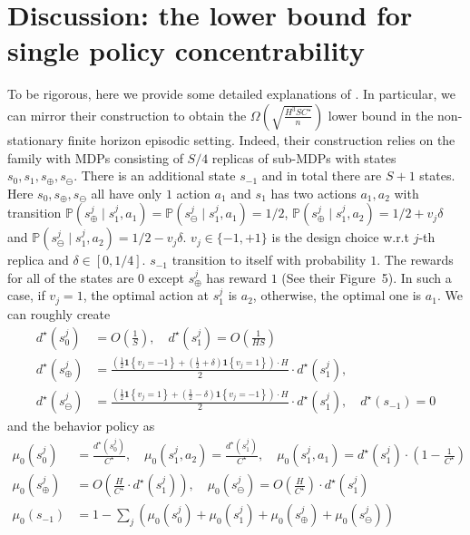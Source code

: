 \section{Discussion: the lower bound for single policy concentrability}\label{sec:dis_VPVI}


To be rigorous, here we provide some detailed explanations of \cite{rashidinejad2021bridging}. In particular, we can mirror their construction to obtain the $\Omega(\sqrt{\frac{H^3SC^\star}{n}})$ lower bound in the non-stationary finite horizon episodic setting. Indeed, their construction relies on the family with MDPs consisting of $S/4$ replicas of sub-MDPs with states $s_{0},s_1, s_{\oplus}, s_{\ominus}$. There is an additional state $s_{-1}$ and in total there are $S+1$ states. Here $s_{0},s_{\oplus}, s_{\ominus}$ all have only $1$ action $a_1$ and $s_1$ has two actions $a_1,a_2$ with transition $\mathbb{P}\left(s_{\oplus}^{j} \mid s_{1}^{j}, a_{1}\right)=\mathbb{P}\left(s_{\ominus}^{j} \mid s_{1}^{j}, a_{1}\right)=1 / 2$, $\mathbb{P}\left(s_{\oplus}^{j} \mid s_{1}^{j}, a_{2}\right)=1 / 2+v_{j} \delta$ and $\mathbb{P}\left(s_{\ominus}^{j} \mid s_{1}^{j}, a_{2}\right)=1 / 2-v_{j} \delta$. $v_{j} \in\{-1,+1\}$ is the design choice w.r.t $j$-th replica and $\delta \in[0,1 / 4]$. $s_{-1}$ transition to itself with probability $1$. The rewards for all of the states are $0$ except $s_{\oplus}^{j}$ has reward $1$ (See their Figure~5). In such a case, if $v_j = 1$, the optimal action at $s^j_1$ is $a_2$, otherwise, the optimal one is $a_1$. We can roughly create
\[
\begin{aligned}
d^{\star}\left(s_{0}^{j}\right) &=O(\frac{1}{S}), \quad d^{\star}\left(s_{1}^{j}\right)=O(\frac{1}{H S}) \\
d^{\star}\left(s_{\oplus}^{j}\right) &=\frac{\left(\frac{1}{2} \mathbf{1}\left\{v_{j}=-1\right\}+\left(\frac{1}{2}+\delta\right) \mathbf{1}\left\{v_{j}=1\right\}\right)\cdot H}{2} \cdot d^{\star}\left(s_{1}^{j}\right), \\
d^{\star}\left(s_{\ominus}^{j}\right) &=\frac{\left(\frac{1}{2} \mathbf{1}\left\{v_{j}=1\right\}+\left(\frac{1}{2}-\delta\right) \mathbf{1}\left\{v_{j}=-1\right\}\right)\cdot H}{2} \cdot d^{\star}\left(s_{1}^{j}\right), \quad d^{\star}\left(s_{-1}\right)=0
\end{aligned}
\]
and the behavior policy as 
\[
\begin{aligned}
\mu_{0}\left(s_{0}^{j}\right) &=\frac{d^{\star}\left(s_{0}^{j}\right)}{C^{\star}}, \quad \mu_{0}\left(s_{1}^{j}, a_{2}\right)=\frac{d^{\star}\left(s_{1}^{j}\right)}{C^{\star}}, \quad \mu_{0}\left(s_{1}^{j}, a_{1}\right)=d^{\star}\left(s_{1}^{j}\right) \cdot\left(1-\frac{1}{C^{\star}}\right) \\
\mu_{0}\left(s_{\oplus}^{j}\right) &= O(\frac{H}{C^{\star}} \cdot d^{\star}\left(s_{1}^{j}\right)), \quad \mu_{0}\left(s_{\ominus}^{j}\right)=O(\frac{H}{C^{\star}}) \cdot d^{\star}\left(s_{1}^{j}\right) \\
\mu_{0}\left(s_{-1}\right) &=1-\sum_{j}\left(\mu_{0}\left(s_{0}^{j}\right)+\mu_{0}\left(s_{1}^{j}\right)+\mu_{0}\left(s_{\oplus}^{j}\right)+\mu_{0}\left(s_{\ominus}^{j}\right)\right)
\end{aligned}
\]
